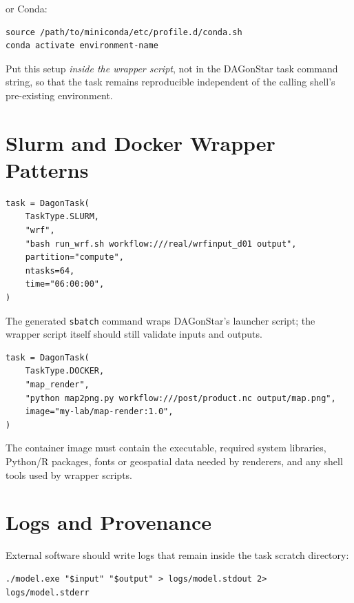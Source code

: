 or Conda:

\begin{lstlisting}[style=bash]
source /path/to/miniconda/etc/profile.d/conda.sh
conda activate environment-name
\end{lstlisting}

\begin{practicebox}
Put this setup \emph{inside the wrapper script}, not in the DAGonStar task
command string, so that the task remains reproducible independent of the
calling shell's pre-existing environment.
\end{practicebox}

\section{Slurm and Docker Wrapper Patterns}

\begin{lstlisting}[caption={Slurm wrapper pattern: command focus stays on the model, resources are declared at construction time.}]
task = DagonTask(
    TaskType.SLURM,
    "wrf",
    "bash run_wrf.sh workflow:///real/wrfinput_d01 output",
    partition="compute",
    ntasks=64,
    time="06:00:00",
)
\end{lstlisting}

The generated \texttt{sbatch} command wraps DAGonStar's launcher script; the
wrapper script itself should still validate inputs and outputs.

\begin{lstlisting}[caption={Docker wrapper pattern.}]
task = DagonTask(
    TaskType.DOCKER,
    "map_render",
    "python map2png.py workflow:///post/product.nc output/map.png",
    image="my-lab/map-render:1.0",
)
\end{lstlisting}

The container image must contain the executable, required system libraries,
Python/R packages, fonts or geospatial data needed by renderers, and any
shell tools used by wrapper scripts.

\section{Logs and Provenance}

External software should write logs that remain inside the task scratch
directory:

\begin{lstlisting}[style=bash]
./model.exe "$input" "$output" > logs/model.stdout 2> logs/model.stderr
\end{lstlisting}

